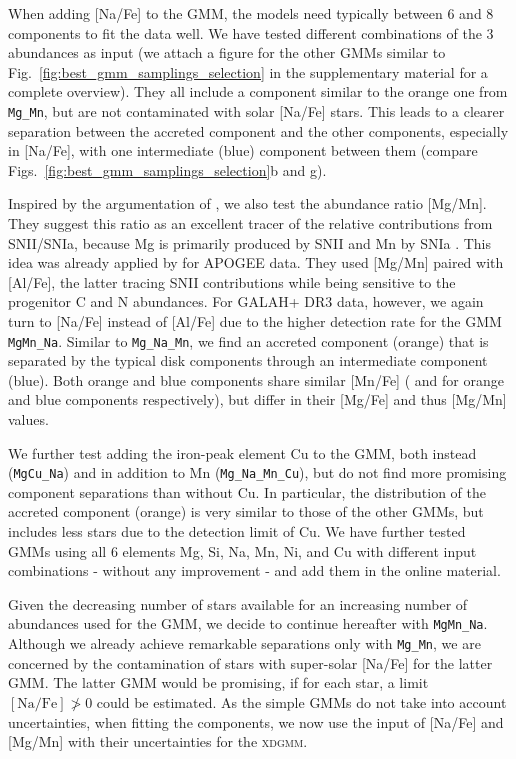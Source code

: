\documentclass[fleqn,usenatbib]{mnras}
\begin{document}
When adding [Na/Fe] to the GMM, the models need typically between 6 and 8 components to fit the data well. We have tested different combinations of the 3 abundances as input (we attach a figure for the other GMMs similar to Fig.~\ref{fig:best_gmm_samplings_selection} in the supplementary material for a complete overview). They all include a component similar to the orange one from \texttt{Mg\_Mn}, but are not contaminated with solar [Na/Fe] stars. This leads to a clearer separation between the accreted component and the other components, especially in [Na/Fe], with one intermediate (blue) component between them (compare Figs.~\ref{fig:best_gmm_samplings_selection}b and g). 

Inspired by the argumentation of \citet{Hawkins2015}, we also test the abundance ratio [Mg/Mn]. They suggest this ratio as an excellent tracer of the relative contributions from SNII/SNIa, because Mg is primarily produced by SNII \citep{Nomoto2013} and Mn by SNIa \citep{Gratton1989}. This idea was already applied by \citet{Das2020} for APOGEE data. They used [Mg/Mn] paired with [Al/Fe], the latter tracing SNII contributions while being sensitive to the progenitor C and N abundances. For GALAH+ DR3 data, however, we again turn to [Na/Fe] instead of [Al/Fe] due to the higher detection rate for the GMM \texttt{MgMn\_Na}. Similar to \texttt{Mg\_Na\_Mn}, we find an accreted component (orange) that is separated by the typical disk components through an intermediate component (blue). Both orange and blue components share similar [Mn/Fe] ( and  for orange and blue components respectively), but differ in their [Mg/Fe] and thus [Mg/Mn] values.

We further test adding the iron-peak element Cu to the GMM, both instead  (\texttt{MgCu\_Na}) and in addition to Mn (\texttt{Mg\_Na\_Mn\_Cu}), but do not find more promising component separations than without Cu. In particular, the distribution of the accreted component (orange) is very similar to those of the other GMMs, but includes less stars due to the detection limit of Cu. We have further tested GMMs using all 6 elements Mg, Si, Na, Mn, Ni, and Cu with different input combinations - without any improvement - and add them in the online material.

Given the decreasing number of stars available for an increasing number of abundances used for the GMM, we decide to continue hereafter with \texttt{MgMn\_Na}. Although we already achieve remarkable separations only with \texttt{Mg\_Mn}, we are concerned by the contamination of stars with super-solar [Na/Fe] for the latter GMM. The latter GMM would be promising, if for each star, a limit $\mathrm{[Na/Fe]} \ngtr 0$ could be estimated. As the simple GMMs do not take into account uncertainties, when fitting the components, we now use the input of [Na/Fe] and [Mg/Mn] with their uncertainties for the \textsc{xdgmm}.
\end{document}
